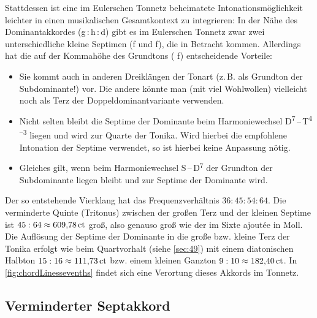Stattdessen ist eine im Eulerschen Tonnetz beheimatete Intonationsmöglichkeit
leichter in einen musikalischen Gesamtkontext zu integrieren: In der Nähe des
Dominantakkordes (g\,:\,\naturalm h\,:\,d) gibt es im Eulerschen Tonnetz zwar
zwei unterschiedliche kleine Septimen (\natural f und \naturalp f), die in
Betracht kommen.  Allerdings hat die auf der Kommahöhe des Grundtons (\natural
f) entscheidende Vorteile:
\begin{itemize}
\item Sie kommt auch in anderen Dreiklängen der Tonart (z.\,B. als Grundton der
  Subdominante!) vor.  Die andere könnte man (mit viel Wohlwollen) vielleicht
  noch als Terz der Doppeldominantvariante verwenden.
\item Nicht selten bleibt die Septime der Dominante beim Harmoniewechsel
  D\textsuperscript{$7$}\,–\,T\textsuperscript{$4$–$3$} liegen und wird zur
  Quarte der Tonika.  Wird hierbei die empfohlene Intonation der Septime
  verwendet, so ist hierbei keine Anpassung nötig.
\item Gleiches gilt, wenn beim Harmoniewechsel S\,–\,D\textsuperscript{$7$} der
  Grundton der Subdominante liegen bleibt und zur Septime der Dominante wird.
\end{itemize}
Der so entstehende Vierklang hat das Frequenzverhältnis $36:45:54:64$. Die
verminderte Quinte (Tritonus) zwischen der großen Terz und der kleinen Septime
ist $45:64\approx 609{,}78\,\mathrm{ct}$ groß, also genauso groß wie der im Sixte
ajoutée in Moll. Die Auflösung der Septime der Dominante in die große bzw.
kleine Terz der Tonika erfolgt wie beim Quartvorhalt (siehe \cref{sec:49}) mit
einem diatonischen Halbton $15:16\approx 111{,}73\,\mathrm{ct}$ bzw. einem kleinen
Ganzton $9:10\approx 182{,}40\,\mathrm{ct}$. In
\cref{fig:chordLinessevenths} findet sich eine Verortung dieses Akkords im
Tonnetz.

\subsection{Verminderter Septakkord}
\label{sec:dim7syn}


